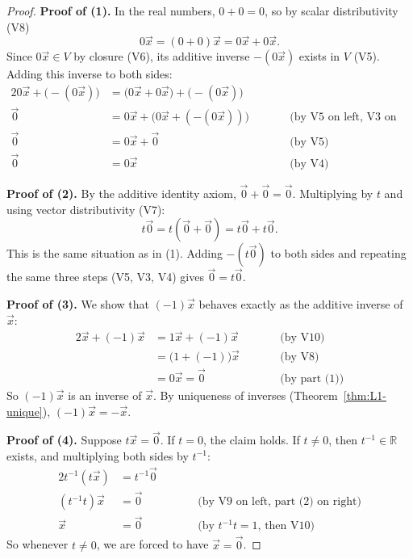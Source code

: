 \begin{proof}
\textbf{Proof of (1).} In the real numbers, $0 + 0 = 0$, so by scalar distributivity (V8)
\[
0\vec{x} = (0 + 0)\vec{x} = 0\vec{x} + 0\vec{x}.
\]
Since $0\vec{x} \in V$ by closure (V6), its additive inverse $-(0\vec{x})$ exists in $V$ (V5). Adding this inverse to both sides:
\begin{alignat*}{2}
0\vec{x} + \bigl(-(0\vec{x})\bigr) &= \bigl(0\vec{x} + 0\vec{x}\bigr) + \bigl(-(0\vec{x})\bigr) && \\
\vec{0} &= 0\vec{x} + \bigl(0\vec{x} + (-(0\vec{x}))\bigr) &\qquad& \text{(by V5 on left, V3 on right)} \\
\vec{0} &= 0\vec{x} + \vec{0}                              &&       \text{(by V5)} \\
\vec{0} &= 0\vec{x}                                        &&       \text{(by V4)}
\end{alignat*}

\textbf{Proof of (2).} By the additive identity axiom, $\vec{0} + \vec{0} = \vec{0}$. Multiplying by $t$ and using vector distributivity (V7):
\[
t\vec{0} = t(\vec{0} + \vec{0}) = t\vec{0} + t\vec{0}.
\]
This is the same situation as in (1). Adding $-(t\vec{0})$ to both sides and repeating the same three steps (V5, V3, V4) gives $\vec{0} = t\vec{0}$.

\medskip
\textbf{Proof of (3).} We show that $(-1)\vec{x}$ behaves exactly as the additive inverse of $\vec{x}$:
\begin{alignat*}{2}
\vec{x} + (-1)\vec{x} &= 1\vec{x} + (-1)\vec{x}        &\qquad& \text{(by V10)} \\
                      &= \bigl(1 + (-1)\bigr)\vec{x}   &&       \text{(by V8)} \\
                      &= 0\vec{x} = \vec{0}            &&       \text{(by part (1))}
\end{alignat*}
So $(-1)\vec{x}$ is an inverse of $\vec{x}$. By uniqueness of inverses (Theorem~\ref{thm:L1-unique}), $(-1)\vec{x} = -\vec{x}$.

\medskip
\textbf{Proof of (4).} Suppose $t\vec{x} = \vec{0}$. If $t = 0$, the claim holds. If $t \neq 0$, then $t^{-1} \in \mathbb{R}$ exists, and multiplying both sides by $t^{-1}$:
\begin{alignat*}{2}
t^{-1}(t\vec{x}) &= t^{-1}\vec{0} && \\
(t^{-1}t)\vec{x} &= \vec{0}       &\qquad& \text{(by V9 on left, part (2) on right)} \\
\vec{x}          &= \vec{0}       &&       \text{(by $t^{-1}t = 1$, then V10)}
\end{alignat*}
So whenever $t \neq 0$, we are forced to have $\vec{x} = \vec{0}$.
\end{proof}

